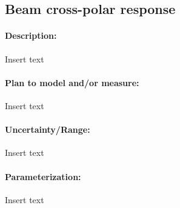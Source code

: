 \subsection{Beam cross-polar response}

\paragraph{Description:}
Insert text

\paragraph{Plan to model and/or measure:}
Insert text

\paragraph{Uncertainty/Range:}
Insert text

\paragraph{Parameterization:}
Insert text